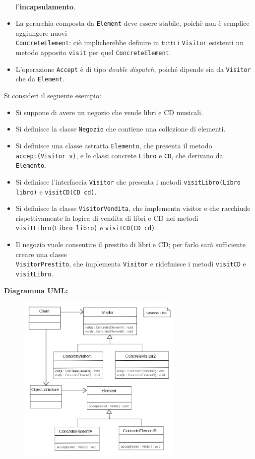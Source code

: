\begin{solution}
\begin{itemize}
	\\l'\textbf{incapsulamento}.
	\item La gerarchia composta da \texttt{Element} deve essere stabile, poichè non è semplice aggiungere nuovi \\\texttt{ConcreteElement}: ciò implicherebbe definire in tutti i \texttt{Visitor} esistenti un metodo apposito \texttt{visit} per quel \texttt{ConcreteElement}.
	\item L'operazione \texttt{Accept} è di tipo \textit{double dispatch}, poiché dipende sia da \texttt{Visitor} che da \texttt{Element}.
\end{itemize}
Si consideri il seguente esempio:
\begin{itemize}
	\item Si suppone di avere un negozio che vende libri e CD musicali.
	\item Si definisce la classe \texttt{Negozio} che contiene una collezione di elementi.
	\item Si definisce una classe astratta \texttt{Elemento}, che presenta il metodo \texttt{accept(Visitor v)}, e le classi concrete \texttt{Libro} e \texttt{CD}, che derivano da \texttt{Elemento}.
	\item Si definisce l'interfaccia \texttt{Visitor} che presenta i metodi \texttt{visitLibro(Libro libro)} e \texttt{visitCD(CD cd)}.
	\item Si definisce la classe \texttt{VisitorVendita}, che implementa visitor e che racchiude rispettivamente la logica di vendita di libri e CD nei metodi \texttt{visitLibro(Libro libro)} e \texttt{visitCD(CD cd)}.
	\item Il negozio vuole consentire il prestito di libri e CD; per farlo sarà sufficiente creare una classe\\\texttt{VisitorPrestito}, che implementa \texttt{Visitor} e ridefinisce i metodi \texttt{visitCD} e \texttt{visitLibro}.
\end{itemize}

\textbf{Diagramma UML:}
\begin{figure}[htb!]
	\centering
	\label{ObserverPattern}
	\includegraphics[width=8cm]{./immagini/visitorPattern.png}
\end{figure}
\end{solution}


